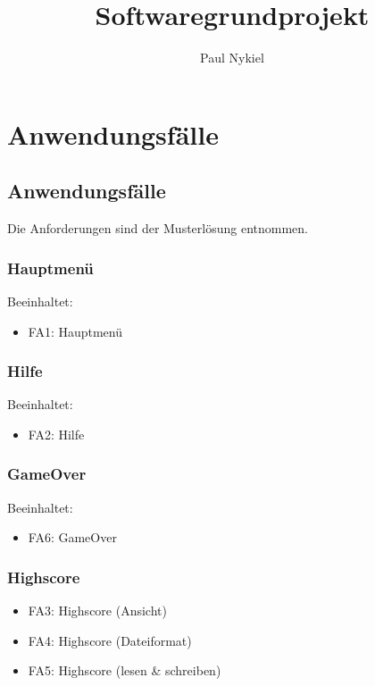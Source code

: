 \documentclass[DIN, pagenumber=false, fontsize=11pt, parskip=half]{scrartcl}
\title{Softwaregrundprojekt}
\author{Paul Nykiel}
\begin{document}
    \maketitle
    \section{Anwendungsfälle}
    \subsection{Anwendungsfälle}
    Die Anforderungen sind der Musterlösung entnommen.
    \subsubsection{Hauptmenü}
    Beeinhaltet:
    \begin{itemize}
            \item FA1: Hauptmenü
    \end{itemize}
    \subsubsection{Hilfe}
    Beeinhaltet:
    \begin{itemize}
            \item FA2: Hilfe
    \end{itemize}
    \subsubsection{GameOver}
    Beeinhaltet:
    \begin{itemize}
            \item FA6: GameOver 
    \end{itemize}
    \subsubsection{Highscore}
    \begin{itemize}
        \item FA3: Highscore (Ansicht)
        \item FA4: Highscore (Dateiformat)
        \item FA5: Highscore (lesen \& schreiben)
    \end{itemize}
\end{document}
